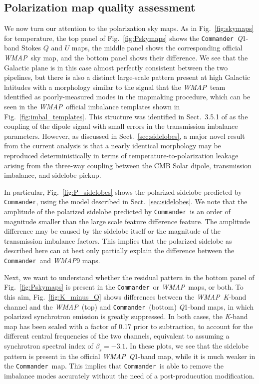 \documentclass[twocolumn]{aa}
\def\WMAP{\emph{WMAP}}
\def\commander{\texttt{Commander}}
\newcommand{\K}[0]{\textit K}
\newcommand{\Q}[0]{\textit Q}
\begin{document}
\subsection{Polarization map quality assessment}

We now turn our attention to the polarization sky maps. As in
Fig.~\ref{fig:skymaps} for temperature, the top panel of
Fig.~\ref{fig:Pskymaps} shows the \commander\ \Q1-band Stokes $Q$ and $U$ maps,
the middle panel shows the corresponding official \WMAP\ sky map, and the
bottom panel shows their difference. We see that the Galactic plane is in this
case almost perfectly consistent between the two pipelines, but there is also a
distinct large-scale pattern present at high Galactic latitudes with a
morphology similar to the signal that the \WMAP\ team identified as poorly-measured
modes in the mapmaking procedure, which can be seen in the \WMAP\
official imbalance templates shown in Fig.~\ref{fig:imbal_templates}. This structure was
identified in Sect.~3.5.1 of \citet{jarosik2007} as the coupling of the dipole
signal with small errors in the transmission imbalance parameters. However, as
discussed in Sect.~\ref{sec:sidelobes}, a major novel result from the current
analysis is that a nearly identical morphology may be reproduced
deterministically in terms of temperature-to-polarization leakage arising from
the three-way coupling between the CMB Solar dipole, transmission imbalance,
and sidelobe pickup. 

In particular, Fig.~\ref{fig:P_sidelobes} shows the polarized sidelobe
predicted by \commander, using the model described in
Sect.~\ref{sec:sidelobes}.  We note that the amplitude of the polarized
sidelobe predicted by \commander\ is an order of magnitude smaller than the
large scale feature difference feature. The amplitude difference may be caused
by the sidelobe itself or the magnitude of the transmission imbalance factors.
This implies that the polarized sidelobe as described here can at best only
partially explain the difference between the \commander\ and \WMAP9 maps.


Next, we want to understand whether the residual pattern in the bottom panel of
Fig.~\ref{fig:Pskymaps} is present in the \commander\ or \WMAP\ maps, or both.
To this aim, Fig.~\ref{fig:K_minus_Q} shows differences between the \WMAP\
\K-band channel and the \WMAP\ (top) and \commander\ (bottom) \Q1-band maps, in
which polarized synchrotron emission is greatly suppressed. In both cases, the
\K-band map has been scaled with a factor of 0.17 prior to subtraction, to
account for the different central frequencies of the two channels, equivalent
to assuming a synchrotron spectral index of $\beta_{\mathrm{s}}=-3.1$. In these
plots, we see that the sidelobe pattern is present in the official \WMAP\
\Q1-band map, while it is much weaker in the \commander\ map. This implies that
\commander\ is able to remove the imbalance modes accurately without the
need of a post-producution modification.
\end{document}
